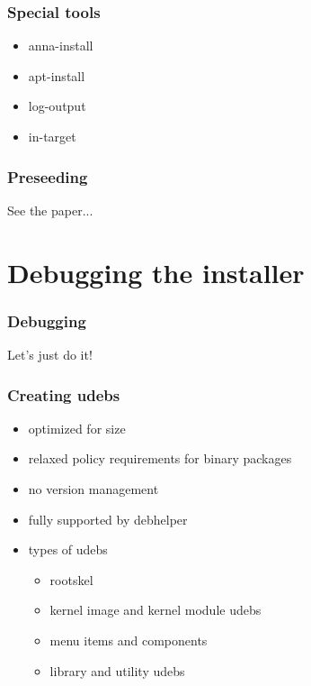 \documentclass{beamer}
\begin{document}
\begin{frame}
  \frametitle{Special tools}
	\begin{itemize}
	\item anna-install
	\item apt-install
	\item log-output
	\item in-target
	\end{itemize}
\end{frame}

\begin{frame}
  \frametitle{Preseeding}
\begin{large}
	See the paper...
\end{large}
\end{frame}

\section{Debugging the installer}

\begin{frame}
  \frametitle{Debugging}
\begin{huge}
	Let's just do it!
\end{huge}
\end{frame}

\begin{frame}
  \frametitle{Creating udebs}
	\begin{itemize}
	\item
		optimized for size
	\item
		relaxed policy requirements for binary packages
	\item
		no version management
	\item
		fully supported by debhelper
	\item
		types of udebs
		\begin{itemize}
		\item
			rootskel
		\item
			kernel image and kernel module udebs
		\item
			menu items and components
		\item
			library and utility udebs
		\end{itemize}
	\end{itemize}
\end{frame}
\end{document}
